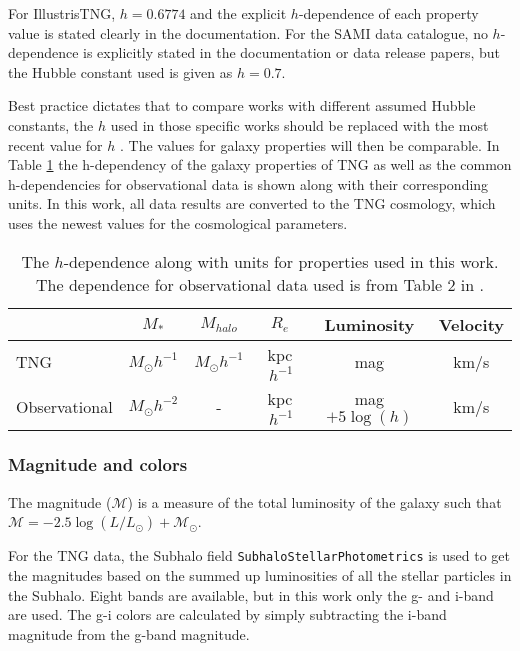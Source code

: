For IllustrisTNG, $h=0.6774$ and the explicit $h$-dependence of each property value is stated clearly in the documentation. For the SAMI data catalogue, no $h$-dependence is explicitly stated in the documentation or data release papers, but the Hubble constant used is given as $h = 0.7$.

Best practice dictates that to compare works with different assumed Hubble constants, the $h$ used in those specific works should be replaced with the most recent value for $h$ \parencite{Croton2013}. The values for galaxy properties will then be comparable. In Table \ref{h_dependence} the h-dependency of the galaxy properties of TNG as well as the common h-dependencies for observational data is shown along with their corresponding units. In this work, all data results are converted to the TNG cosmology, which uses the newest values for the cosmological parameters.

\begin{table}
\begin{center}
\caption{The $h$-dependence along with units for properties used in this work. The dependence for observational data used is from Table 2 in \textcite{Croton2013}.}
\label{h_dependence}
\begin{tabular}{ l| c c c c c }
 \hline
 \hline
   & $M_*$ & $M_{halo}$ & $R_e$ & Luminosity & Velocity \\
 \hline
 TNG & $M_{\odot}h^{-1}$ & $M_{\odot}h^{-1}$ & kpc$\,h^{-1}$ & mag & km/s \\ 
 Observational & $M_{\odot}h^{-2}$ & - & kpc$\,h^{-1}$ & mag $+5\log(h)$ & km/s \\
 \hline 
\end{tabular}
\end{center}
\end{table}

\subsubsection{Magnitude and colors}
The magnitude ($\mathcal{M}$) is a measure of the total luminosity of the galaxy such that $\mathcal{M} = -2.5 \log(L/L_\odot) + \mathcal{M}_\odot$.

For the TNG data, the Subhalo field \texttt{SubhaloStellarPhotometrics} is used to get the magnitudes based on the summed up luminosities of all the stellar particles in the Subhalo. Eight bands are available, but in this work only the g- and i-band are used. The g-i colors are calculated by simply subtracting the i-band magnitude from the g-band magnitude.

